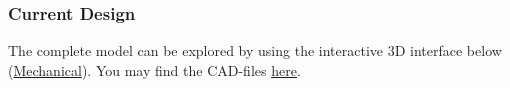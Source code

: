 \bigskip

\subsubsection{Current Design}

The complete model can be explored by using the interactive 3D interface below (\href{https://matt-rbt.github.io/Lab-Cleanup-Robot-using-the-Mirte-Master-Platform/mechanical/}{Mechanical}). You may find the CAD-files \href{https://cad.onshape.com/documents/ee158bec245e3fe46f63c9ce/w/a0c8c76ba94ff339073118d4/e/a16fbc4a88cf67fd9fba6368?renderMode=0\&uiState=6a2aaef65092a9418fe6a8f1}{here}.